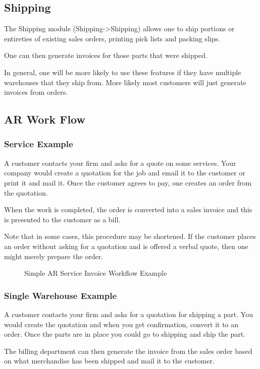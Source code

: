 \documentclass{article}
\begin{document}
\subsection{Shipping}
The Shipping module (Shipping-\textgreater Shipping) allows one to ship portions or
entireties of existing sales orders, printing pick lists and packing slips.  

One can then generate invoices for those parts that were shipped.

In general, one will be more likely to use these features if they have multiple
warehouses that they ship from.  More likely most customers will just generate
invoices from orders.

\subsection{AR Work Flow}
\subsubsection{Service Example}

A customer contacts your firm and asks for a quote on some services.  Your
company would create a quotation for the job and email it to the customer or
print it and mail it.  Once the customer agrees to pay, one creates an order
from the quotation.

When the work is completed, the order is converted into a sales invoice and this
is presented to the customer as a bill.

Note that in some cases, this procedure may be shortened.  If the customer
places an order without asking for a quotation and is offered a verbal quote,
then one might merely prepare the order.

\begin{figure}[hbtp]
\caption{Simple AR Service Invoice Workflow Example}

\end{figure}

\subsubsection{Single Warehouse Example}

A customer contacts your firm and asks for a quotation for shipping a part.  You
would create the quotation and when you get confirmation, convert it to an
order.  Once the parts are in place you could go to shipping and ship the part.

The billing department can then generate the invoice from the sales order based
on what merchandise has been shipped and mail it to the customer.
\end{document}
